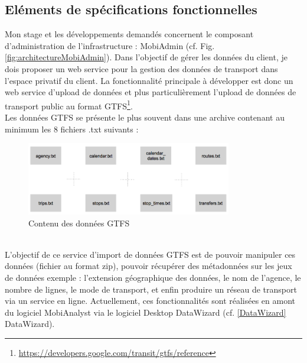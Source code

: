 \subsection{Eléments de spécifications fonctionnelles}

Mon stage et les développements demandés concernent le composant d'administration de l'infrastructure : \og MobiAdmin \fg (cf. Fig. \ref{fig:architectureMobiAdmin}). Dans l'objectif de gérer les données du client, je dois proposer un web service pour la gestion des données de transport dans l'espace privatif du client.
La fonctionnalité principale à développer est donc un web service d'upload de données et plus particulièrement l'upload de données de transport public au format GTFS\footnote{\url{https://developers.google.com/transit/gtfs/reference}}.\\ 

Les données GTFS se présente le plus souvent dans une archive contenant au minimum les 8 fichiers .txt suivants :
\\
\begin{figure}[h]
	\centering
		\includegraphics[width=0.8\textwidth]{images/GTFS_8fichiers.png}
	\caption{Contenu des données GTFS}
	\label{fig:GTFS_8fichiers}
\end{figure}\\


L'objectif de ce service d'import de données GTFS est de pouvoir manipuler ces données (fichier au format zip), pouvoir récupérer des métadonnées sur les jeux de données exemple : l'extension géographique des données, le nom de l'agence, le nombre de lignes, le mode de transport, et enfin produire un réseau de transport via un service en ligne. Actuellement, ces fonctionnalités sont réalisées en amont du logiciel MobiAnalyst via le logiciel Desktop DataWizard (cf. \ref{DataWizard} DataWizard).\\

